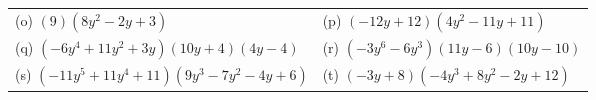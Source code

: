 \begin{enumerate}[noitemsep, label=\textbf{\arabic*}. ]
{\begin{tabular}[t]{|l|l|}
        (o) $\left(9\right)\left(8{y}^{2}-2y+3\right)$ &
        (p) $\left(-12y+12\right)\left(4{y}^{2}-11y+11\right)$%
     \tabularnewline\cline{1-1}\cline{2-2}
        (q) $\left(-6{y}^{4}+11{y}^{2}+3y\right)\left(10y+4\right)\left(4y-4\right)$ &
        (r) $\left(-3{y}^{6}-6{y}^{3}\right)\left(11y-6\right)\left(10y-10\right)$%
     \tabularnewline\cline{1-1}\cline{2-2}
        (s) $\left(-11{y}^{5}+11{y}^{4}+11\right)\left(9{y}^{3}-7{y}^{2}-4y+6\right)$ &
        (t) $\left(-3y+8\right)\left(-4{y}^{3}+8{y}^{2}-2y+12\right)$%
     \tabularnewline\cline{1-1}\cline{2-2}
    \end{tabular}} %
\end{enumerate}
